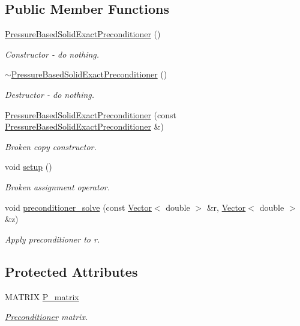 \subsection*{Public Member Functions}
\begin{DoxyCompactItemize}
\item 
\hyperlink{classoomph_1_1PressureBasedSolidExactPreconditioner_a073924e293fc44655b5d2d11fbe18c56}{Pressure\+Based\+Solid\+Exact\+Preconditioner} ()
\begin{DoxyCompactList}\small\item\em Constructor -\/ do nothing. \end{DoxyCompactList}\item 
\hyperlink{classoomph_1_1PressureBasedSolidExactPreconditioner_a2d505f2b8f06846bd191552ee63c40a1}{$\sim$\+Pressure\+Based\+Solid\+Exact\+Preconditioner} ()
\begin{DoxyCompactList}\small\item\em Destructor -\/ do nothing. \end{DoxyCompactList}\item 
\hyperlink{classoomph_1_1PressureBasedSolidExactPreconditioner_ae4b0de5a28bb44588d7186a911314c5a}{Pressure\+Based\+Solid\+Exact\+Preconditioner} (const \hyperlink{classoomph_1_1PressureBasedSolidExactPreconditioner}{Pressure\+Based\+Solid\+Exact\+Preconditioner} \&)
\begin{DoxyCompactList}\small\item\em Broken copy constructor. \end{DoxyCompactList}\item 
void \hyperlink{classoomph_1_1PressureBasedSolidExactPreconditioner_ab9bdbcabd0ba8e9debfbec6679e66b08}{setup} ()
\begin{DoxyCompactList}\small\item\em Broken assignment operator. \end{DoxyCompactList}\item 
void \hyperlink{classoomph_1_1PressureBasedSolidExactPreconditioner_ae7fce5484d8c480111a3a0929adcfaf4}{preconditioner\+\_\+solve} (const \hyperlink{classoomph_1_1Vector}{Vector}$<$ double $>$ \&r, \hyperlink{classoomph_1_1Vector}{Vector}$<$ double $>$ \&z)
\begin{DoxyCompactList}\small\item\em Apply preconditioner to r. \end{DoxyCompactList}\end{DoxyCompactItemize}
\subsection*{Protected Attributes}
\begin{DoxyCompactItemize}
\item 
M\+A\+T\+R\+IX \hyperlink{classoomph_1_1PressureBasedSolidExactPreconditioner_a4fc2a6a063affff56ae040896cedbb2b}{P\+\_\+matrix}
\begin{DoxyCompactList}\small\item\em \hyperlink{classoomph_1_1Preconditioner}{Preconditioner} matrix. \end{DoxyCompactList}\end{DoxyCompactItemize}
